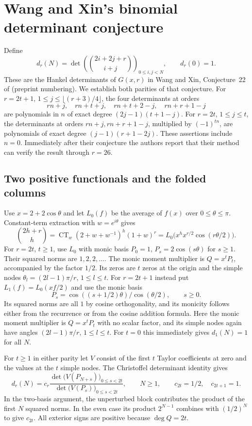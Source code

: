\documentclass[11pt,a4paper]{article}
\begin{document}
\section{Wang and Xin's binomial determinant conjecture}
Define
\[
 d_r(N)=\det\left(\binom{2i+2j+r}{i+j}\right)_{0\le i,j<N},
 \qquad d_r(0)=1.
\]
These are the Hankel determinants of $G(x,r)$ in Wang and Xin, Conjecture~22 of \cite{WX} (preprint numbering). We establish both parities of that conjecture.
For $r=2t+1$, $1\le j\le\lfloor(r+3)/4\rfloor$, the four determinants at orders
\[
 rn+j,\quad rn+t+j,\quad rn+t+2-j,\quad rn+r+1-j
\]
are polynomials in $n$ of exact degree $(2j-1)(t+1-j)$.
For $r=2t$, $1\le j\le t$, the determinants at orders $rn+j,rn+r+1-j$, multiplied by $(-1)^{tn}$, are polynomials of exact degree $(j-1)(r+1-2j)$. These assertions include $n=0$. Immediately after their conjecture the authors report that their method can verify the result through $r=26$.

\subsection*{Two positive functionals and the folded columns}
Use $x=2+2\cos\theta$ and let $L_0(f)$ be the average of $f(x)$ over $0\le\theta\le\pi$. Constant-term extraction with $w=e^{i\theta}$ gives
\[
 \binom{2h+r}{h}
 =\operatorname{CT}_w(2+w+w^{-1})^h(1+w)^r
 =L_0\big(x^h x^{r/2}\cos(r\theta/2)\big).
\]
For $r=2t$, $t\ge1$, use $L_0$ with monic basis $P_0=1$, $P_s=2\cos(s\theta)$ for $s\ge1$. Their squared norms are $1,2,2,\ldots$. The monic moment multiplier is $Q=x^t P_t$, accompanied by the factor $1/2$. Its zeros are $t$ zeros at the origin and the simple nodes
$\theta_l=(2l-1)\pi/r$, $1\le l\le t$. For $r=2t+1$ instead put $L_1(f)=L_0(xf/2)$ and use the monic basis
\[
 P_s=\cos((s+1/2)\theta)/\cos(\theta/2),\qquad s\ge0.
\]
Its squared norms are all $1$ by cosine orthogonality, and its monicity follows either from the recurrence or from the cosine addition formula. Here the monic moment multiplier is $Q=x^tP_t$ with no scalar factor, and its simple nodes again have angles $(2l-1)\pi/r$, $1\le l\le t$. For $t=0$ this immediately gives $d_1(N)=1$ for all $N$.

For $t\ge1$ in either parity let $V$ consist of the first $t$ Taylor coefficients at zero and the values at the $t$ simple nodes. The Christoffel determinant identity gives
\[
 d_r(N)=c_r\frac{\det\big(V(P_{N+s})\big)_{0\le s<2t}}{\det\big(V(P_s)\big)_{0\le s<2t}},\qquad N\ge1,
 \qquad c_{2t}=1/2,\quad c_{2t+1}=1.
\]
In the two-basis argument, the unperturbed block contributes the product of the first $N$ squared norms. In the even case its product $2^{N-1}$ combines with $(1/2)^N$ to give $c_{2t}$. All exterior signs are positive because $\deg Q=2t$.
\end{document}
